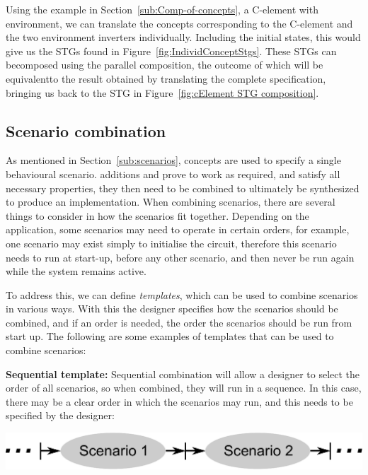 \documentclass[british, journal]{IEEEtran}
\begin{document}
Using the example in Section~\ref{sub:Comp-of-concepts}, a C-element with
environment,
we can translate the concepts corresponding to the C-element and the two
environment inverters individually. Including the initial states, this would
give us the STGs found in Figure~\ref{fig:IndividConceptStgs}. These STGs can becomposed using the parallel composition, the outcome of which will be equivalentto the result obtained by translating the complete specification, bringing us
back
to the STG in Figure~\ref{fig:cElement STG composition}.

\vspace{-1mm}
\subsection{Scenario combination\label{sub:scenario-composition}}

As mentioned in Section~\ref{sub:scenarios}, concepts are used to specify
a single behavioural scenario.
additions
and prove to work as required, and satisfy all necessary properties, they then
need to be combined to
ultimately be synthesized to produce an implementation.
When combining scenarios, there are several things to consider in
how the scenarios fit together. Depending on the application,
some scenarios may need to operate in certain
orders, for example, one scenario may exist simply to initialise the
circuit, therefore this scenario needs to run at start-up, before
any other scenario, and then never be run again while the
system remains active.

To address this, we can define \emph{templates},
which can be used to combine scenarios in various ways.
With this the designer specifies how the scenarios should
be combined, and if an order is needed, the order the scenarios should
be run from start up. The following are some examples of templates
that can be used to combine scenarios:

\textbf{Sequential template:} Sequential combination will allow a designer
to select the order of all scenarios, so when combined, they will
run in a sequence. In this case, there may be a clear order in which
the scenarios may run, and this needs to be specified by the designer:

\vspace{-2mm}
\begin{center}
\includegraphics[scale=0.42]{Images/sequential_combination}
\end{center}
\end{document}
